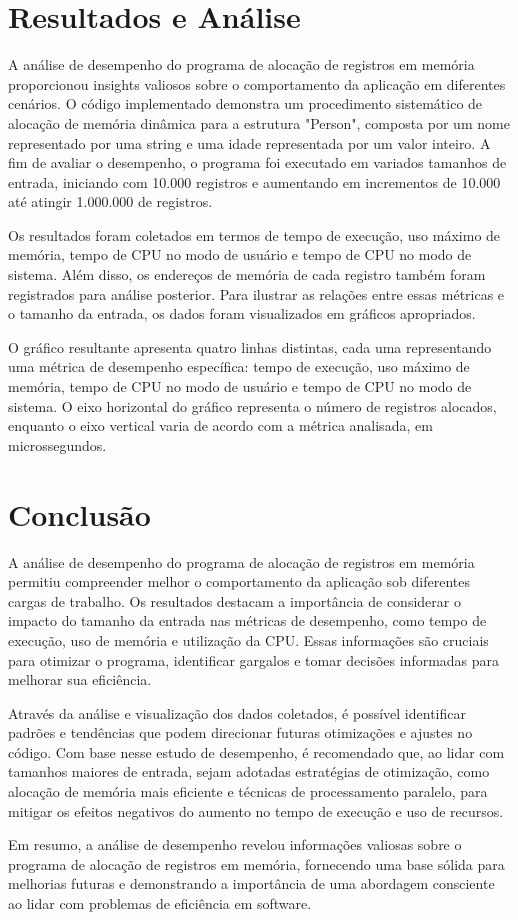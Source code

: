 \documentclass[a2paper,12pt]{article}
\begin{document}
\section{Resultados e Análise}
A análise de desempenho do programa de alocação de registros em memória proporcionou insights valiosos sobre o comportamento da aplicação em diferentes cenários. O código implementado demonstra um procedimento sistemático de alocação de memória dinâmica para a estrutura "Person", composta por um nome representado por uma string e uma idade representada por um valor inteiro. A fim de avaliar o desempenho, o programa foi executado em variados tamanhos de entrada, iniciando com 10.000 registros e aumentando em incrementos de 10.000 até atingir 1.000.000 de registros.

Os resultados foram coletados em termos de tempo de execução, uso máximo de memória, tempo de CPU no modo de usuário e tempo de CPU no modo de sistema. Além disso, os endereços de memória de cada registro também foram registrados para análise posterior. Para ilustrar as relações entre essas métricas e o tamanho da entrada, os dados foram visualizados em gráficos apropriados.

O gráfico resultante apresenta quatro linhas distintas, cada uma representando uma métrica de desempenho específica: tempo de execução, uso máximo de memória, tempo de CPU no modo de usuário e tempo de CPU no modo de sistema. O eixo horizontal do gráfico representa o número de registros alocados, enquanto o eixo vertical varia de acordo com a métrica analisada, em microssegundos.

\section{Conclusão}
A análise de desempenho do programa de alocação de registros em memória permitiu compreender melhor o comportamento da aplicação sob diferentes cargas de trabalho. Os resultados destacam a importância de considerar o impacto do tamanho da entrada nas métricas de desempenho, como tempo de execução, uso de memória e utilização da CPU. Essas informações são cruciais para otimizar o programa, identificar gargalos e tomar decisões informadas para melhorar sua eficiência.

Através da análise e visualização dos dados coletados, é possível identificar padrões e tendências que podem direcionar futuras otimizações e ajustes no código. Com base nesse estudo de desempenho, é recomendado que, ao lidar com tamanhos maiores de entrada, sejam adotadas estratégias de otimização, como alocação de memória mais eficiente e técnicas de processamento paralelo, para mitigar os efeitos negativos do aumento no tempo de execução e uso de recursos.

Em resumo, a análise de desempenho revelou informações valiosas sobre o programa de alocação de registros em memória, fornecendo uma base sólida para melhorias futuras e demonstrando a importância de uma abordagem consciente ao lidar com problemas de eficiência em software.
\end{document}
